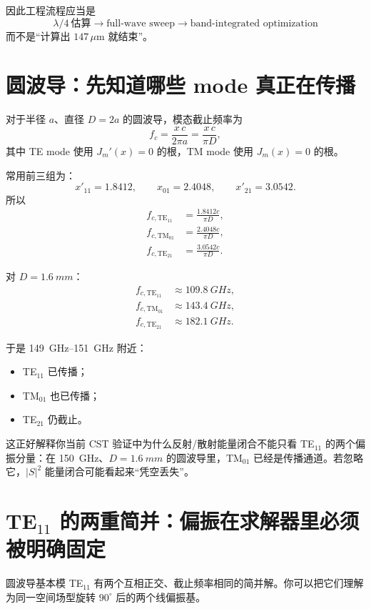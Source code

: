 \documentclass[11pt,a4paper,openany]{ctexrep}
\begin{document}
因此工程流程应当是
\[
\boxed{
\lambda/4\ \text{估算}
\rightarrow
\text{full-wave sweep}
\rightarrow
\text{band-integrated optimization}
}
\]
而不是“计算出 $147\,\mu$m 就结束”。

\section{圆波导：先知道哪些 mode 真正在传播}

对于半径 $a$、直径 $D=2a$ 的圆波导，模态截止频率为
\[
f_c=\frac{x\,c}{2\pi a}=\frac{x\,c}{\pi D},
\]
其中 TE mode 使用 $J_m'(x)=0$ 的根，TM mode 使用 $J_m(x)=0$ 的根。

常用前三组为：
\[
x'_{11}=1.8412,\qquad x_{01}=2.4048,\qquad x'_{21}=3.0542.
\]
所以
\[
\begin{aligned}
f_{c,\mathrm{TE}_{11}}&=\frac{1.8412c}{\pi D},\\
f_{c,\mathrm{TM}_{01}}&=\frac{2.4048c}{\pi D},\\
f_{c,\mathrm{TE}_{21}}&=\frac{3.0542c}{\pi D}.
\end{aligned}
\]

对 $D=\SI{1.6}{mm}$：
\[
\boxed{
\begin{aligned}
f_{c,\mathrm{TE}_{11}}&\approx\SI{109.8}{GHz},\\
f_{c,\mathrm{TM}_{01}}&\approx\SI{143.4}{GHz},\\
f_{c,\mathrm{TE}_{21}}&\approx\SI{182.1}{GHz}.
\end{aligned}}
\]

于是 \SIrange{149}{151}{GHz} 附近：
\begin{itemize}
  \item TE$_{11}$ 已传播；
  \item TM$_{01}$ 也已传播；
  \item TE$_{21}$ 仍截止。
\end{itemize}

\begin{projectbox}
这正好解释你当前 CST 验证中为什么反射/散射能量闭合不能只看 TE$_{11}$ 的两个偏振分量：在 \SI{150}{GHz}、$D=\SI{1.6}{mm}$ 的圆波导里，TM$_{01}$ 已经是传播通道。若忽略它，$|S|^2$ 能量闭合可能看起来“凭空丢失”。
\end{projectbox}

\section{TE$_{11}$ 的两重简并：偏振在求解器里必须被明确固定}

圆波导基本模 TE$_{11}$ 有两个互相正交、截止频率相同的简并解。你可以把它们理解为同一空间场型旋转 $90^\circ$ 后的两个线偏振基。
\end{document}
